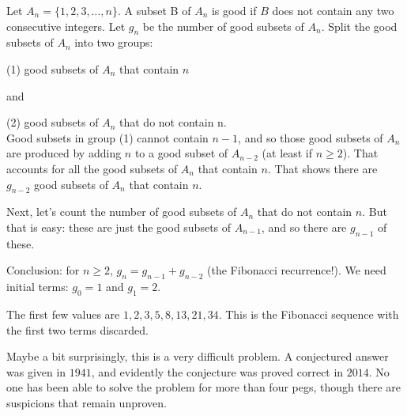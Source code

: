 \begin{Solution}{34.7}
Let $A_{n}= \{1,2,3,\ldots,n\}$.
A subset B of $A_{n}$ is good if $B$
 does not contain any two consecutive integers. 
Let $g_{n}$ be the number of good subsets of $A_{n}$.
Split the good subsets of $A_{n}$ into two groups:

(1) good subsets of $A_{n}$ that contain $n$

and

(2) good subsets of $A_{n}$ that do not contain n.\\[3pt]


Good subsets in group (1)  cannot contain $n-1$, and so those good 
subsets of $A_{n}$
 are produced by adding $n$ to a good subset of $A_{n-2}$
 (at least if $n\geq 2$). That accounts for all the good
 subsets of $A_{n}$ that contain $n$. 
That shows there are $g_{n-2}$ good subsets of $A_{n}$ that contain $n$.

Next, let's count the number of good subsets of $A_{n}$ that do not contain $n$.
But that is easy: these are just the good subsets of $A_{n-1}$, and so there are 
$g_{n-1}$ of these.

Conclusion: for $n\geq 2$, $g_{n}= g_{n-1} + g_{n-2}$ (the Fibonacci recurrence!).
We need initial terms: $g_{0}= 1$ and $g_{1}= 2$.

The first few values are $1, 2, 3, 5, 8, 13, 21, 34$. This is the Fibonacci
sequence with the first two terms discarded.

\end{Solution}


\begin{Solution}{34.8}

Maybe a bit surprisingly, this is a very difficult problem. A conjectured answer was given in $1941$, and evidently the conjecture was proved correct in $2014$.  No one has been able to solve the problem for more than four pegs,
though there are suspicions that remain unproven.

\end{Solution}

